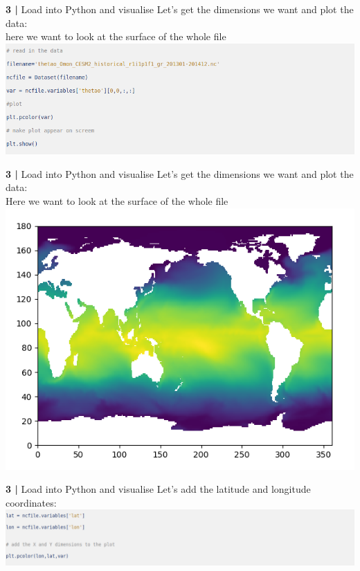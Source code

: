  
\begin{frame}{\textbf{3 |} Load into Python and visualise} 
    Let's get the dimensions we want and plot the data:\\
        \vspace{0.5cm}
    here we want to look at the surface of the whole file
        \vspace{0.5cm}
    \includegraphics[scale=0.35]{images/Script1_step3.png}
\end{frame}
 
 
\begin{frame}{\textbf{3 |} Load into Python and visualise} 
    Let's get the dimensions we want and plot the data:\\
        \vspace{0.5cm}
    Here we want to look at the surface of the whole file
        \vspace{0.5cm}
    \includegraphics[scale=0.35]{images/script1_fig1.png}
\end{frame}
 
  
\begin{frame}{\textbf{3 |} Load into Python and visualise} 
    Let's add the latitude and longitude coordinates:\\
        \vspace{0.5cm}
    \includegraphics[scale=0.35]{images/Script1_step4.png}
\end{frame}
  
